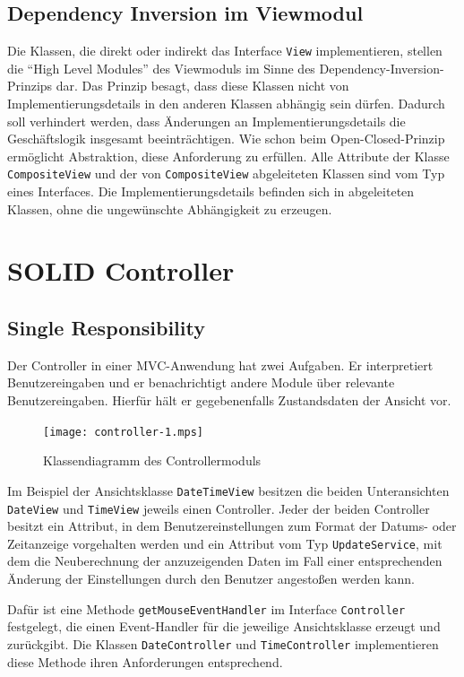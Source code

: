 \documentclass{vldb}
\begin{document}
\subsection{Dependency Inversion im Viewmodul}
Die Klassen, die direkt oder indirekt das Interface \texttt{View} implementieren, stellen die ``High Level Modules'' des Viewmoduls im Sinne des Dependency-Inversion-Prinzips dar. Das Prinzip besagt, dass diese Klassen nicht von Implementierungsdetails in den anderen Klassen abhängig sein dürfen. Dadurch soll verhindert werden, dass Änderungen an Im\-ple\-men\-tie\-rungs\-de\-tails die Geschäftslogik insgesamt beein\-trächtigen. Wie schon beim Open-Closed-Prinzip ermöglicht Abstraktion, diese Anforderung zu erfüllen. Alle Attribute der Klasse \texttt{CompositeView} und der von \texttt{CompositeView} ab\-gelei\-teten Klassen sind vom Typ eines Interfaces. Die Implementierungsdetails befinden sich in abgeleiteten Klassen, oh\-ne die un\-ge\-wünsch\-te Abhängigkeit zu erzeugen.

\section{SOLID Controller}
\subsection{Single Responsibility}
Der Controller in einer MVC-Anwendung hat zwei Aufgaben. Er interpretiert Benutzereingaben und er be\-nach\-rich\-tigt andere Module über relevante Be\-nut\-zer\-ein\-ga\-ben. Hier\-für hält er gegebenenfalls Zustandsdaten der Ansicht vor.

\begin{figure}[h]
  \centering
  \texttt{[image: controller-1.mps]}
  \caption{Klassendiagramm des Controllermoduls}
  \label{controllermps}
\end{figure}

Im Beispiel der Ansichtsklasse \texttt{DateTimeView} besitzen die beiden Unteransichten \texttt{DateView} und \texttt{TimeView} jeweils einen Controller. Jeder der beiden Controller besitzt ein Attribut, in dem Benutzereinstellungen zum Format der Datums- oder Zeitanzeige vorgehalten werden und ein Attribut vom Typ \texttt{UpdateService}, mit dem die Neuberechnung der an\-zu\-zei\-gen\-den Daten im Fall einer entsprechenden Änderung der Einstellungen durch den Benutzer angestoßen werden kann.

Da\-für ist eine Methode \texttt{getMouseEventHandler} im Interface \texttt{Con\-troller} festgelegt, die einen Event-Handler für die je\-wei\-li\-ge Ansichtsklasse erzeugt und zurückgibt. Die Klassen \texttt{DateController} und \texttt{TimeController} implementieren diese Methode ihren Anforderungen entsprechend.
\end{document}
